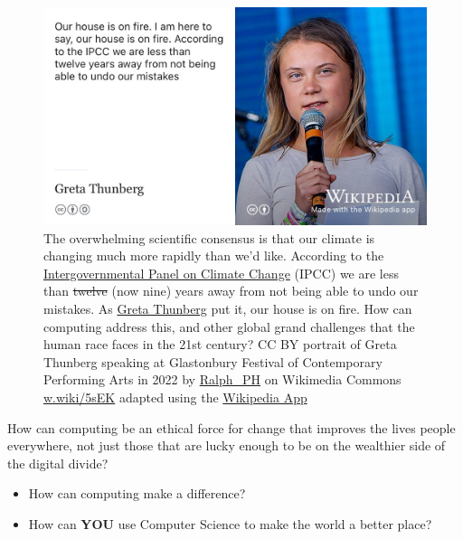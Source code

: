 \documentclass[
]{book}
\providecommand{\tightlist}{%
  \setlength{\itemsep}{0pt}\setlength{\parskip}{0pt}}
\begin{document}
\begin{figure}

{\centering \includegraphics[width=1\linewidth]{images/greta-thunberg} 

}

\caption{The overwhelming scientific consensus is that our climate is changing much more rapidly than we'd like. According to the \href{https://en.wikipedia.org/wiki/Intergovernmental_Panel_on_Climate_Change}{Intergovernmental Panel on Climate Change} (IPCC) we are less than \sout{twelve} (now nine) years away from not being able to undo our mistakes. As \href{https://en.wikipedia.org/wiki/Greta_Thunberg}{Greta Thunberg} put it, our house is on fire. \citep{gretathunberg} How can computing address this, and other global grand challenges that the human race faces in the 21st century? CC BY portrait of Greta Thunberg speaking at Glastonbury Festival of Contemporary Performing Arts in 2022 by \href{https://www.flickr.com/people/69880995@N04}{Ralph\_PH} on Wikimedia Commons \href{https://w.wiki/5sEK}{w.wiki/5sEK} adapted using the \href{https://apps.apple.com/gb/app/wikipedia/id324715238}{Wikipedia App}}\label{fig:greta-fig}
\end{figure}



How can computing be an ethical force for change that improves the lives people everywhere, not just those that are lucky enough to be on the wealthier side of the digital divide?

\begin{itemize}
\tightlist
\item
  How can computing make a difference?
\item
  How can \textbf{YOU} use Computer Science to make the world a better place?
\end{itemize}
\end{document}

